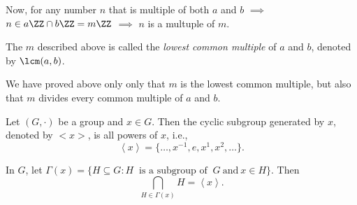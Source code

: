 Now, for any number $n$ that is multiple of both $a$ and $b$ $\implies$ $n \in a\ZZ \cap b\ZZ = m\ZZ$  $\implies$ $n$ is a multuple of $m$.

\begin{defn}
	The $m$ described above is called the \emph{lowest common multiple} of $a$ and $b$, denoted by $\lcm(a, b)$.
\end{defn}

We have proved above only only that $m$ is the lowest common multiple, but also that $m$ divides every common multiple of $a$ and $b$.

\begin{defn}
	Let $(G,\cdot)$ be a group and  $x \in G$. Then the cyclic subgroup generated by $x$, denoted by $<x>$, is all powers of $x$, i.e., \[\left<x\right> = \{\dots, x^{-1}, e, x^1, x^2, \dots\}.\]
\end{defn}

\begin{thm}
	In $G$, let $\Gamma(x) = \{H \subseteq G : H\ \text{ is a subgroup of }\ G\ \text{and}\ x \in H\}$. Then \[\bigcap_{H \in \Gamma(x)} H = \left<x\right>.\]
\end{thm}
